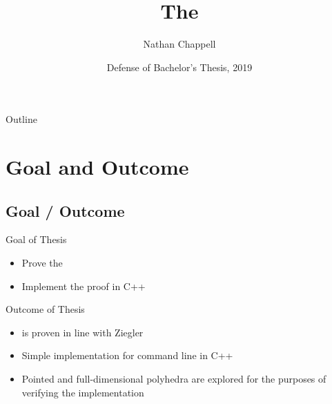\documentclass{beamer}
\title %
{The \MWT}
\author %
{Nathan Chappell\inst{1}}
\institute %
{
	\inst{1}%
	Charles University\\
	Faculty of Mathematics and Physics
}
\date %
{Defense of Bachelor's Thesis, 2019}
\begin{document}
\begin{frame}
	\titlepage
\end{frame}

\begin{frame}{Outline}
	\tableofcontents
\end{frame}






\section{Goal and Outcome}

\subsection{Goal / Outcome}

\begin{frame}{Goal of Thesis}
\begin{itemize}
  \item<1-> Prove the {\MWT}
  \item<2-> Implement the proof in C++
\end{itemize}
\end{frame}

\begin{frame}{Outcome of Thesis}
\begin{itemize}
  \item<1-> {\MWT} is proven in line with Ziegler
  \item<2-> Simple implementation for command line in C++
  \item<3-> Pointed and full-dimensional polyhedra are explored for the purposes of verifying the implementation
\end{itemize}
\end{frame}
\end{document}
